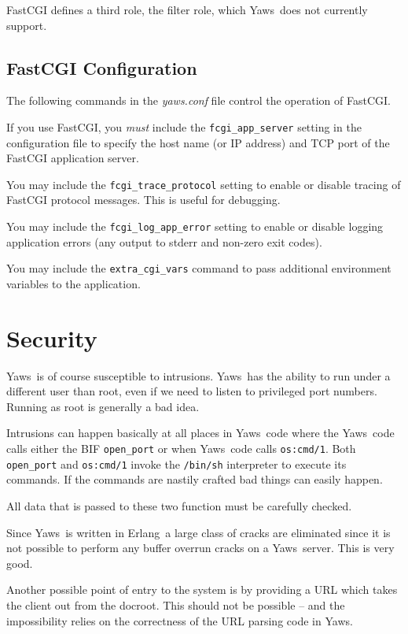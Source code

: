 \documentclass[11pt,oneside,english]{book}
\newcommand{\Erlang}            %
        {{\sc Erlang}}
\newcommand{\Yaws}            %
        {{\sc Yaws}}
\begin{document}
FastCGI defines a third role, the filter role, which
\Yaws\  does not currently support.


\section{FastCGI Configuration}

The following commands in the \textit{yaws.conf} file control the
operation of FastCGI.

If you use FastCGI, you \emph{must} include the \verb+fcgi_app_server+
setting in the configuration file to specify the host name (or IP address)
and TCP port of the FastCGI application server.

You may include the \verb+fcgi_trace_protocol+ setting to enable or disable
tracing of FastCGI protocol messages. This is useful for debugging.

You may include the \verb+fcgi_log_app_error+ setting to enable or disable
logging application errors (any output to stderr and non-zero exit codes).

You may include the \verb+extra_cgi_vars+ command to pass additional
environment variables to the application.


\chapter{Security}

\Yaws\  is of course susceptible to intrusions. \Yaws\  has the
ability to run under a different user than root, even if we need
to listen to privileged port numbers. Running as root is generally a
bad idea.

Intrusions can happen basically at all places in \Yaws\ code where the
\Yaws\ code calls either the BIF \verb+open_port+ or when \Yaws\ code
calls \verb+os:cmd/1+. Both \verb+open_port+ and \verb+os:cmd/1+
invoke the \verb+/bin/sh+ interpreter to execute its commands. If the
commands are nastily crafted bad things can easily happen.

All data that is passed to these two function must be carefully
checked.

Since \Yaws\  is written in \Erlang\  a large class of cracks are
eliminated since it is not possible to perform any buffer overrun
cracks on a \Yaws\  server. This is very good.


Another possible point of entry to the system is by providing a URL
which takes the client out from the docroot. This should not be
possible -- and the impossibility relies on the correctness of the URL
parsing code in \Yaws{}.
\end{document}
